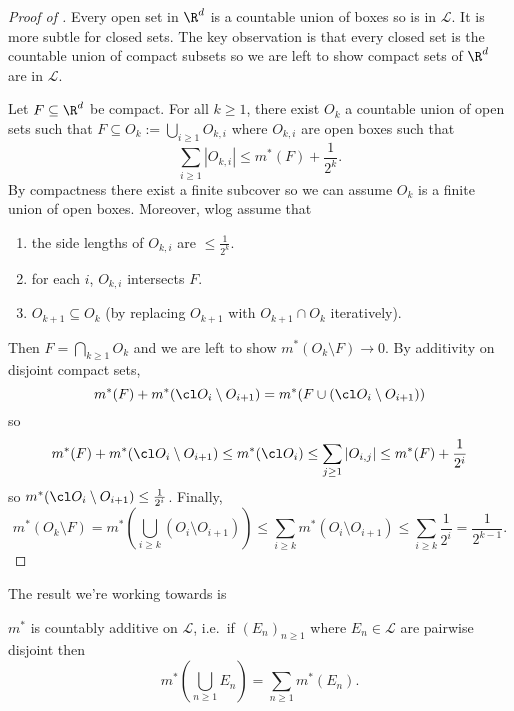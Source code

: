 \documentclass[a4paper]{article}
\begin{document}
\begin{proof}[Proof of ]
  Every open set in \(\R^d\) is a countable union of boxes so is in \(\mathcal L\). It is more subtle for closed sets. %
  The key observation is that every closed set is the countable union of compact subsets so we are left to show compact sets of \(\R^d\) are in \(\mathcal L\).

  Let \(F \subseteq \R^d\) be compact. For all \(k \geq 1\), there exist \(O_k\) a countable union of open sets such that \(F \subseteq O_k := \bigcup_{i \geq 1} O_{k, i}\) where \(O_{k, i}\) are open boxes such that
  \[
    \sum_{i \geq 1} |O_{k, i}| \leq m^*(F) + \frac{1}{2^k}.
  \]
  By compactness there exist a finite subcover so we can assume \(O_k\) is a finite union of open boxes. Moreover, wlog assume that
  \begin{enumerate}
  \item the side lengths of \(O_{k, i}\) are \(\leq \frac{1}{2^k}\).
  \item for each \(i\), \(O_{k, i}\) intersects \(F\).
  \item \(O_{k + 1} \subseteq O_k\) (by replacing \(O_{k + 1}\) with \(O_{k + 1} \cap O_k\) iteratively).
  \end{enumerate}
  Then \(F = \bigcap_{k \geq 1} O_k\) and we are left to show \(m^*(O_k \setminus F) \to 0\). By additivity on disjoint compact sets,
  \[
    m^*(F) + m^*(\cl O_i \setminus O_{i + 1}) = m^*(F \cup (\cl O_i \setminus O_{i + 1}))
  \]
  so
  \[
    m^*(F) + m^*(\cl O_i \setminus O_{i + 1}) \leq m^*(\cl O_i)
    \leq \sum_{j \geq 1} |O_{i, j}|
    \leq m^*(F) + \frac{1}{2^i}
  \]
  so \(m^*(\cl O_i \setminus O_{i + 1}) \leq \frac{1}{2^i}\). Finally,
  \[
    m^*(O_k \setminus F)
    = m^*(\bigcup_{i \geq k} (O_i \setminus O_{i + 1}))
    \leq \sum_{i \geq k} m^*(O_i \setminus O_{i + 1})
    \leq \sum_{i \geq k} \frac{1}{2^i}
    = \frac{1}{2^{k - 1}}.
  \]
\end{proof}

The result we're working towards is

\begin{proposition}
  \label{prop:additivity of Lebesgue measure}
  \(m^*\) is countably additive on \(\mathcal L\), i.e.\ if \((E_n)_{n \geq 1}\) where \(E_n \in \mathcal L\) are pairwise disjoint then
  \[
    m^*(\bigcup_{n \geq 1} E_n) = \sum_{n \geq 1} m^*(E_n).
  \]
\end{proposition}
\end{document}
